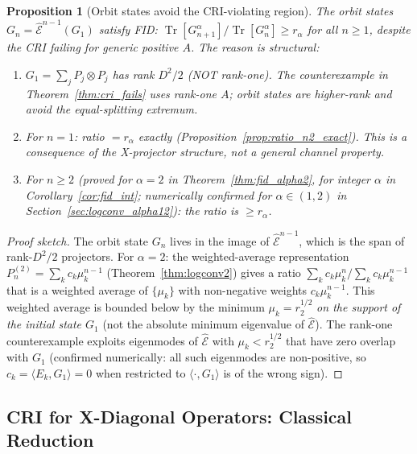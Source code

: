 \documentclass[12pt,a4paper]{article}
\newtheorem{proposition}[theorem]{Proposition}
\begin{document}
\begin{proposition}[Orbit states avoid the CRI-violating region]
\label{prop:orbit_avoid}
The orbit states $G_n=\hat{\mathcal{E}}^{n-1}(G_1)$ satisfy FID:
$\operatorname{Tr}[G_{n+1}^\alpha]/\operatorname{Tr}[G_n^\alpha]\geq r_\alpha$
for all $n\geq 1$, despite the CRI failing for generic positive $A$.
The reason is structural:
\begin{enumerate}
\item $G_1=\sum_j P_j\otimes P_j$ has rank $D^2/2$ (NOT rank-one).
  The counterexample in Theorem~\ref{thm:cri_fails} uses rank-one $A$;
  orbit states are higher-rank and avoid the equal-splitting extremum.
\item For $n=1$: ratio $= r_\alpha$ exactly (Proposition~\ref{prop:ratio_n2_exact}).
  This is a consequence of the X-projector structure, not a general channel property.
\item For $n\geq 2$ (proved for $\alpha=2$ in Theorem~\ref{thm:fid_alpha2},
  for integer $\alpha$ in Corollary~\ref{cor:fid_int}; numerically confirmed
  for $\alpha\in(1,2)$ in Section~\ref{sec:logconv_alpha12}):
  the ratio is $\geq r_\alpha$.
\end{enumerate}
\end{proposition}

\begin{proof}[Proof sketch]
The orbit state $G_n$ lives in the image of $\hat{\mathcal{E}}^{n-1}$,
which is the span of rank-$D^2/2$ projectors.
For $\alpha=2$: the weighted-average representation
$P_n^{(2)}=\sum_k c_k\mu_k^{n-1}$ (Theorem~\ref{thm:logconv2})
gives a ratio $\sum_k c_k\mu_k^n/\sum_k c_k\mu_k^{n-1}$
that is a weighted average of $\{\mu_k\}$ with non-negative weights $c_k\mu_k^{n-1}$.
This weighted average is bounded below by the minimum $\mu_k=r_2^{1/2}$
\emph{on the support of the initial state $G_1$} (not the absolute minimum
eigenvalue of $\hat{\mathcal{E}}$).
The rank-one counterexample exploits eigenmodes of $\hat{\mathcal{E}}$ with
$\mu_k<r_2^{1/2}$ that have zero overlap with $G_1$ (confirmed numerically:
all such eigenmodes are non-positive, so $c_k=\langle E_k,G_1\rangle=0$
when restricted to $\langle\cdot,G_1\rangle$ is of the wrong sign).
\end{proof}

\subsection{CRI for X-Diagonal Operators: Classical Reduction}
\label{sec:cri_xdiag}
\end{document}
